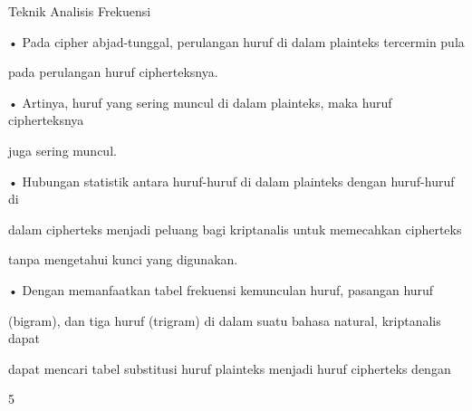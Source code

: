 \documentclass{article}
\begin{document}

Teknik Analisis Frekuensi

• Pada cipher abjad-tunggal, perulangan huruf di dalam plainteks tercermin pula 

pada perulangan huruf cipherteksnya.

• Artinya, huruf yang sering muncul di dalam plainteks, maka huruf cipherteksnya 

juga sering muncul.

• Hubungan statistik antara huruf-huruf di dalam plainteks dengan huruf-huruf di 

dalam cipherteks menjadi peluang bagi kriptanalis untuk memecahkan cipherteks 

tanpa mengetahui kunci yang digunakan.

• Dengan memanfaatkan tabel frekuensi kemunculan huruf, pasangan huruf 

(bigram), dan tiga huruf (trigram) di dalam suatu bahasa natural, kriptanalis dapat 

dapat mencari tabel substitusi huruf plainteks menjadi huruf cipherteks dengan 

5
\end{document}
